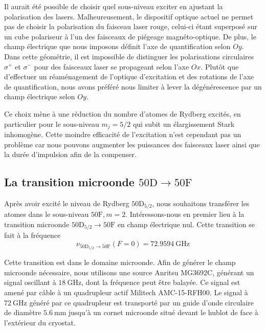 Il aurait été possible de choisir quel sous-niveau exciter en ajustant la polarisation des lasers.
Malheureusement, le dispositif optique actuel ne permet pas de choisir la polarisation du faisceau laser rouge, celui-ci étant superposé sur un cube polariseur à l'un des faisceaux de piégeage magnéto-optique.
De plus, le champ électrique que nous imposons définit l'axe de quantification selon $Oy$.
Dans cette géométrie, il est impossible de distinguer les polarisations circulaires $\sigma^+$ et $\sigma^-$ pour des faisceaux laser se propageant selon l'axe $Ox$.
Plutôt que d'effectuer un réaménagement de l'optique d'excitation et des rotations de l'axe de quantification, nous avons préféré nous limiter à lever la dégénérescence par un champ électrique selon $Oy$.

Ce choix mène à une réduction du nombre d'atomes de Rydberg excités, en particulier pour le sous-niveau $m_j=5/2$ qui subit un élargissement Stark inhomogène.
Cette moindre efficacité de l'excitation n'est cependant pas un problème car nous pouvons augmenter les puissances des faisceaux laser ainsi que la durée d'impulsion afin de la compenser.



\newpage
	\subsection{La transition microonde $\mathrm{50D \rightarrow 50F}$}
\noindent %
Après avoir excité le niveau de Rydberg $\mathrm{50D}_{5/2}$, nous souhaitons transférer les atomes dans le sous-niveau $\mathrm{50F},m=2$.
Intéressons-nous en premier lieu à la transition microonde $\mathrm{50D_{5/2} \rightarrow 50F}$ en champ électrique nul.
Cette transition se fait à la fréquence
\begin{equation}
\label{eq:freq_50D50F}
\nu_{\mathrm{50D_{5/2}\rightarrow50F}}(F=0)%
= \SI{72.9594}{\GHz}
\end{equation}

Cette transition est dans le domaine microonde.
Afin de générer le champ microonde nécessaire, nous utilisons une source Anritsu MG3692C, générant un signal oscillant à $\SI{18}{\GHz}$, dont la fréquence peut être balayée.
Ce signal est amené par câble à un quadrupleur actif Militech AMC-15-RFH00.
Le signal à $\SI{72}{\GHz}$ généré par ce quadrupleur est transporté par un guide d'onde circulaire de diamètre $\SI{5.6}{\mm}$ jusqu'à un cornet microonde situé devant le hublot de face à l'extérieur du cryostat.


